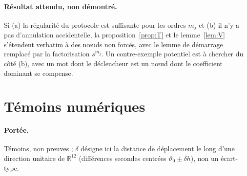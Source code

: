 \documentclass[11pt,a4paper]{article}
\theoremstyle{remark}
\theoremstyle{definition}
\newcommand{\R}{\mathbb R}
\newcommand{\vth}{\vartheta}
\begin{document}
\paragraph{Résultat attendu, non démontré.} Si (a) la régularité du protocole est suffisante pour les ordres $m_j$ et (b) il n'y a pas d'annulation accidentelle, la proposition~\ref{prop:T} et le lemme~\ref{lem:V} s'étendent verbatim à des n\oe uds non forcés, avec le lemme de démarrage remplacé par la factorisation $s^{m_j}$. Un contre-exemple potentiel est à chercher du côté (b), avec un mot dont le déclencheur est un n\oe ud dont le coefficient dominant se compense.

\section{Témoins numériques}\label{sec:num}

\paragraph{Portée.} Témoins, non preuves ; $\delta$ désigne ici la distance de déplacement le long d'une direction unitaire de $\R^{12}$ (différences secondes centrées $\vth_0\pm\delta h$), non un écart-type.
\end{document}
